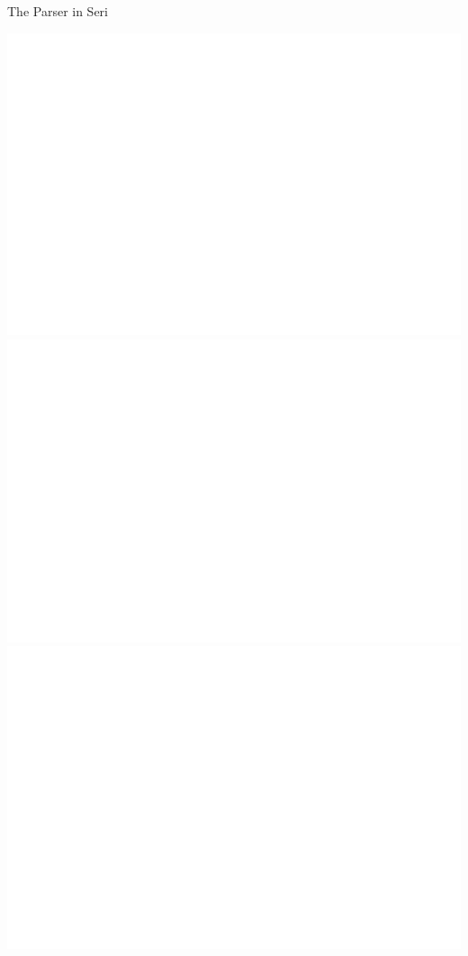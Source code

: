 \documentclass{beamer}
\begin{document}
\begin{frame}{The Parser in Seri}
\begin{overprint}
 \includegraphics[width=\textwidth]{parser1}
 \includegraphics[width=\textwidth]{parser2}
 \includegraphics[width=\textwidth]{parser3}

\end{overprint}
\end{frame}
\end{document}
